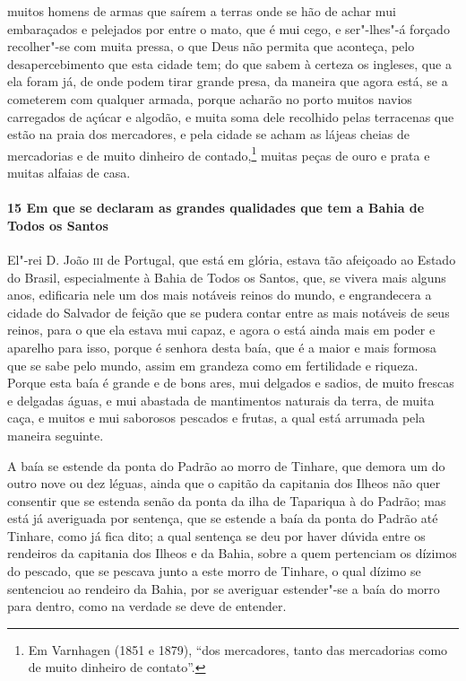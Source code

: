 muitos homens de armas que saírem a terras onde se hão de achar mui embaraçados e
pelejados por entre o mato, que é mui cego, e ser"-lhes"-á forçado recolher"-se com muita
pressa, o que Deus não permita que aconteça, pelo desapercebimento que esta cidade tem; do
que sabem à certeza os ingleses, que a ela foram já, de onde podem tirar grande presa, da
maneira que agora está, se a cometerem com qualquer armada, porque acharão no porto muitos
navios carregados de açúcar e algodão, e muita soma dele recolhido pelas terracenas que
estão na praia dos mercadores, e pela cidade se acham as lájeas cheias de mercadorias e de
muito dinheiro de contado,\footnote{ Em Varnhagen (1851 e 1879), ``dos mercadores, tanto
das mercadorias como de muito dinheiro de contato''.} muitas peças de ouro e prata e
muitas alfaias de casa.

\paragraph{15 Em que se declaram as grandes qualidades que tem a Bahia de Todos os Santos}

El"-rei D. João \textsc{iii} de Portugal, que está em glória, estava tão afeiçoado ao
Estado do Brasil, especialmente à Bahia de Todos os Santos, que, se vivera mais alguns
anos, edificaria nele um dos mais notáveis reinos do mundo, e engrandecera a cidade do
Salvador de feição que se pudera contar entre as mais notáveis de seus reinos, para o que
ela estava mui capaz, e agora o está ainda mais em poder e aparelho para isso, porque é
senhora desta baía, que é a maior e mais formosa que se sabe pelo mundo, assim em grandeza
como em fertilidade e riqueza. Porque esta baía é grande e de bons ares, mui delgados e
sadios, de muito frescas e delgadas águas, e mui abastada de mantimentos naturais da
terra, de muita caça, e muitos e mui saborosos pescados e frutas, a qual está arrumada
pela maneira seguinte.

A baía se estende da ponta do Padrão ao morro de Tinhare, que demora um do outro nove ou
dez léguas, ainda que o capitão da capitania dos Ilheos não quer consentir que se estenda
senão da ponta da ilha de Tapariqua à do Padrão; mas está já averiguada por sentença, que
se estende a baía da ponta do Padrão até Tinhare, como já fica dito; a qual sentença se
deu por haver dúvida entre os rendeiros da capitania dos Ilheos e da Bahia, sobre a quem
pertenciam os dízimos do pescado, que se pescava junto a este morro de Tinhare, o qual
dízimo se sentenciou ao rendeiro da Bahia, por se averiguar estender"-se a baía do morro
para dentro, como na verdade se deve de entender.

